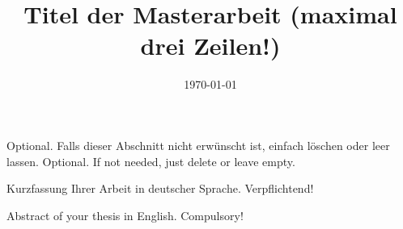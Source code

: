 \documentclass[
  type=MA, %
  lang=german, %
  study=Mech, %
  uni=UMIT, %
  expose=false, %
  explanation=true, %
]{ftwthesis}
\title{Titel der Masterarbeit (maximal drei Zeilen!)}
\date{\today}
\begin{document}
\frontmatter

\begin{Acknowledgment}
  {Optional. Falls dieser Abschnitt nicht erwünscht ist, einfach löschen oder
  leer lassen.}
  {Optional. If not needed, just delete or leave empty.}
\end{Acknowledgment}

\begin{Kurzfassung}
  Kurzfassung Ihrer Arbeit in deutscher Sprache. Verpflichtend!
\end{Kurzfassung}

\begin{Abstract}
  Abstract of your thesis in English. Compulsory!
\end{Abstract}

\tableofcontents\cleardoublepage

\listoffigures\cleardoublepage

\listoftables\cleardoublepage


\mainmatter

\FTWBlindDocument

\backmatter


\end{document}

